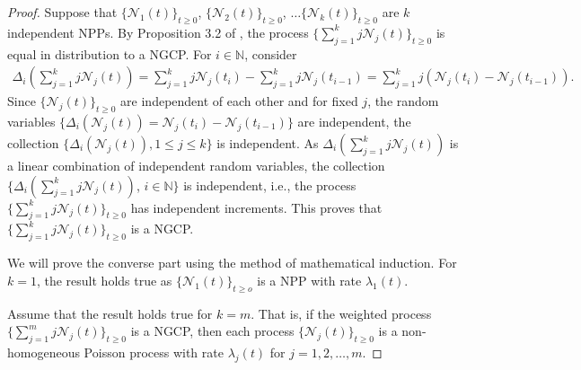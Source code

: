\documentclass[11pt,oneside,reqno]{amsart}
\theoremstyle{definition}
\theoremstyle{remarkstyle}
\begin{document}
\begin{proof}
    Suppose that $\{\mathcal{N}_1(t)\}_{t\ge 0}$, $\{\mathcal{N}_2(t)\}_{t\ge 0}$, $\dots\{\mathcal{N}_k(t)\}_{t\ge 0}$ are $k$ independent NPPs. By Proposition 3.2 of \citet{Tathe2024}, the process $\{\sum_{j=1}^{k}j\mathcal{N}_j(t)\}_{t\ge 0}$ is equal in distribution to a NGCP. For $i\in \mathbb{N}$, consider
    \begin{align}
        \Delta_i\left(\sum_{j=1}^{k}j\mathcal{N}_j(t)\right)=\sum_{j=1}^{k}j\mathcal{N}_j(t_i)-\sum_{j=1}^{k}j\mathcal{N}_j(t_{i-1})=\sum_{j=1}^{k}j\left(\mathcal{N}_j(t_i)-\mathcal{N}_j(t_{i-1})\right).\nonumber
    \end{align}
    Since $\{\mathcal{N}_j(t)\}_{t\ge 0}$ are independent of each other and for fixed $j$, the random variables $\{\Delta_i(\mathcal{N}_j(t))=\mathcal{N}_j(t_i)-\mathcal{N}_j(t_{i-1})\}$ are independent, the collection $\{\Delta_i(\mathcal{N}_j(t)), 1\le j\le k\}$ is independent. As $\Delta_i\left(\sum_{j=1}^{k}j\mathcal{N}_j(t)\right)$ is a linear combination of independent random variables, the collection $\{\Delta_i\left(\sum_{j=1}^{k}j\mathcal{N}_j(t)\right)$, $i\in\mathbb{N}\}$ is independent, i.e., the process $\{\sum_{j=1}^{k}j\mathcal{N}_j(t)\}_{t\ge 0}$ has independent increments. This proves that $\{\sum_{j=1}^{k}j\mathcal{N}_j(t)\}_{t\ge 0}$ is a NGCP. 
    
    We will prove the converse part using the method of mathematical induction. For $k=1$, the result holds true as $\{\mathcal{N}_1(t)\}_{t\ge o}$ is a NPP with rate $\lambda_1(t)$. 
    
    Assume that the result holds true for $k=m$. That is, if the weighted process $\{\sum_{j=1}^{m}j\mathcal{N}_j(t)\}_{t\ge 0}$ is a NGCP, then each process $\{\mathcal{N}_j(t)\}_{t\ge 0}$ is a non-homogeneous Poisson process with rate $\lambda_j(t)$ for $j=1,2,\dots,m$. 
    

\end{proof}
\end{document}
